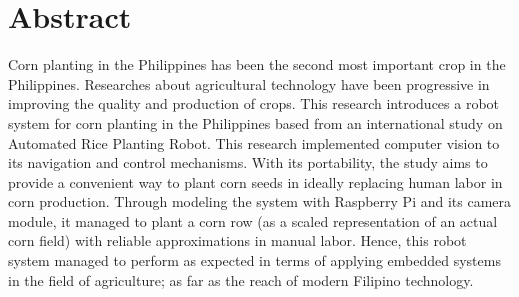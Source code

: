 \chapter*{Abstract}

Corn planting in the Philippines has been the second most important crop in the Philippines. Researches about agricultural technology have been progressive in improving the quality and production of crops. This research introduces a robot system for corn planting in the Philippines based from an international study on Automated Rice Planting Robot. This research implemented computer vision to its navigation and control mechanisms. With its portability, the study aims to provide a convenient way to plant corn seeds in ideally replacing human labor in corn production. Through modeling the system with Raspberry Pi and its camera module, it managed to plant a corn row (as a scaled representation of an actual corn field) with reliable approximations in manual labor. Hence, this robot system managed to perform as expected in terms of applying embedded systems in the field of agriculture; as far as the reach of modern Filipino technology.